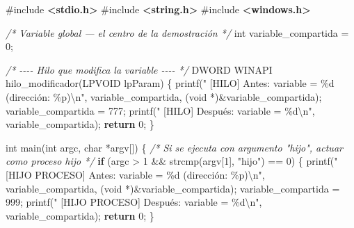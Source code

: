 \documentclass[
  spanish,
]{article}
\newenvironment{Shaded}{}{}
\newcommand{\CommentTok}[1]{\textcolor[rgb]{0.38,0.63,0.69}{\textit{#1}}}
\newcommand{\ControlFlowTok}[1]{\textcolor[rgb]{0.00,0.44,0.13}{\textbf{#1}}}
\newcommand{\DataTypeTok}[1]{\textcolor[rgb]{0.56,0.13,0.00}{#1}}
\newcommand{\DecValTok}[1]{\textcolor[rgb]{0.25,0.63,0.44}{#1}}
\newcommand{\ImportTok}[1]{\textcolor[rgb]{0.00,0.50,0.00}{\textbf{#1}}}
\newcommand{\NormalTok}[1]{#1}
\newcommand{\OperatorTok}[1]{\textcolor[rgb]{0.40,0.40,0.40}{#1}}
\newcommand{\PreprocessorTok}[1]{\textcolor[rgb]{0.74,0.48,0.00}{#1}}
\newcommand{\SpecialCharTok}[1]{\textcolor[rgb]{0.25,0.44,0.63}{#1}}
\newcommand{\StringTok}[1]{\textcolor[rgb]{0.25,0.44,0.63}{#1}}
\begin{document}
\begin{Shaded}
\begin{Highlighting}[]
\PreprocessorTok{\#include }\ImportTok{\textless{}stdio.h\textgreater{}}
\PreprocessorTok{\#include }\ImportTok{\textless{}string.h\textgreater{}}
\PreprocessorTok{\#include }\ImportTok{\textless{}windows.h\textgreater{}}

\CommentTok{/* Variable global — el centro de la demostración */}
\DataTypeTok{int}\NormalTok{ variable\_compartida }\OperatorTok{=} \DecValTok{0}\OperatorTok{;}

\CommentTok{/* {-}{-}{-}{-} Hilo que modifica la variable {-}{-}{-}{-} */}
\NormalTok{DWORD WINAPI hilo\_modificador}\OperatorTok{(}\NormalTok{LPVOID lpParam}\OperatorTok{)} \OperatorTok{\{}
\NormalTok{    printf}\OperatorTok{(}\StringTok{"  [HILO]  Antes: variable = }\SpecialCharTok{\%d}\StringTok{ (dirección: }\SpecialCharTok{\%p}\StringTok{)}\SpecialCharTok{\textbackslash{}n}\StringTok{"}\OperatorTok{,}
\NormalTok{           variable\_compartida}\OperatorTok{,} \OperatorTok{(}\DataTypeTok{void} \OperatorTok{*)\&}\NormalTok{variable\_compartida}\OperatorTok{);}
\NormalTok{    variable\_compartida }\OperatorTok{=} \DecValTok{777}\OperatorTok{;}
\NormalTok{    printf}\OperatorTok{(}\StringTok{"  [HILO]  Después: variable = }\SpecialCharTok{\%d\textbackslash{}n}\StringTok{"}\OperatorTok{,}\NormalTok{ variable\_compartida}\OperatorTok{);}
    \ControlFlowTok{return} \DecValTok{0}\OperatorTok{;}
\OperatorTok{\}}

\DataTypeTok{int}\NormalTok{ main}\OperatorTok{(}\DataTypeTok{int}\NormalTok{ argc}\OperatorTok{,} \DataTypeTok{char} \OperatorTok{*}\NormalTok{argv}\OperatorTok{[])} \OperatorTok{\{}
    \CommentTok{/* Si se ejecuta con argumento "hijo", actuar como proceso hijo */}
    \ControlFlowTok{if} \OperatorTok{(}\NormalTok{argc }\OperatorTok{\textgreater{}} \DecValTok{1} \OperatorTok{\&\&}\NormalTok{ strcmp}\OperatorTok{(}\NormalTok{argv}\OperatorTok{[}\DecValTok{1}\OperatorTok{],} \StringTok{"hijo"}\OperatorTok{)} \OperatorTok{==} \DecValTok{0}\OperatorTok{)} \OperatorTok{\{}
\NormalTok{        printf}\OperatorTok{(}\StringTok{"  [HIJO PROCESO] Antes: variable = }\SpecialCharTok{\%d}\StringTok{ (dirección: }\SpecialCharTok{\%p}\StringTok{)}\SpecialCharTok{\textbackslash{}n}\StringTok{"}\OperatorTok{,}
\NormalTok{               variable\_compartida}\OperatorTok{,} \OperatorTok{(}\DataTypeTok{void} \OperatorTok{*)\&}\NormalTok{variable\_compartida}\OperatorTok{);}
\NormalTok{        variable\_compartida }\OperatorTok{=} \DecValTok{999}\OperatorTok{;}
\NormalTok{        printf}\OperatorTok{(}\StringTok{"  [HIJO PROCESO] Después: variable = }\SpecialCharTok{\%d\textbackslash{}n}\StringTok{"}\OperatorTok{,}
\NormalTok{               variable\_compartida}\OperatorTok{);}
        \ControlFlowTok{return} \DecValTok{0}\OperatorTok{;}
    \OperatorTok{\}}


\end{Highlighting}
\end{Shaded}
\end{document}
